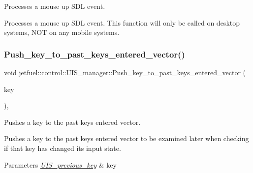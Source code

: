 Processes a mouse up S\+DL event. 

Processes a mouse up S\+DL event. This function will only be called on desktop systems, N\+OT on any mobile systems. \mbox{\label{classjetfuel_1_1control_1_1UIS__manager_afb60b0c7ac07dbe3657eb8a203c4bd45}} 
\subsubsection{\texorpdfstring{Push\+\_\+key\+\_\+to\+\_\+past\+\_\+keys\+\_\+entered\+\_\+vector()}{Push\_key\_to\_past\_keys\_entered\_vector()}}
{\footnotesize\ttfamily void jetfuel\+::control\+::\+U\+I\+S\+\_\+manager\+::\+Push\+\_\+key\+\_\+to\+\_\+past\+\_\+keys\+\_\+entered\+\_\+vector (\begin{DoxyParamCaption}\item[{\hyperlink{structjetfuel_1_1control_1_1UIS__previous__key}{U\+I\+S\+\_\+previous\+\_\+key}}]{key }\end{DoxyParamCaption})\hspace{0.3cm}{\ttfamily [inline]}, {\ttfamily [protected]}}



Pushes a key to the past keys entered vector. 

Pushes a key to the past keys entered vector to be examined later when checking if that key has changed it\textquotesingle{}s input state.


\begin{DoxyParams}{Parameters}
{\em \hyperlink{structjetfuel_1_1control_1_1UIS__previous__key}{U\+I\+S\+\_\+previous\+\_\+key}} & key \\
\hline
\end{DoxyParams}
\mbox{\label{classjetfuel_1_1control_1_1UIS__manager_aa68c473946c11071c3222d63affcfbd4}} 
